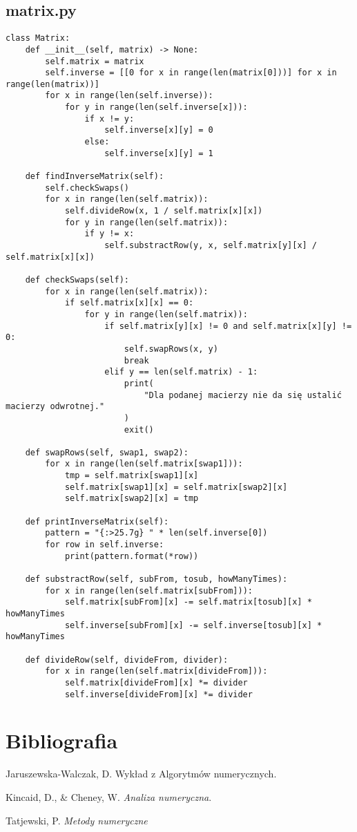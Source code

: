 \documentclass[12pt]{article}
\begin{document}
\subsection{matrix.py}
\begin{verbatim}
class Matrix:
    def __init__(self, matrix) -> None:
        self.matrix = matrix
        self.inverse = [[0 for x in range(len(matrix[0]))] for x in range(len(matrix))]
        for x in range(len(self.inverse)):
            for y in range(len(self.inverse[x])):
                if x != y:
                    self.inverse[x][y] = 0
                else:
                    self.inverse[x][y] = 1

    def findInverseMatrix(self):
        self.checkSwaps()
        for x in range(len(self.matrix)):
            self.divideRow(x, 1 / self.matrix[x][x])
            for y in range(len(self.matrix)):
                if y != x:
                    self.substractRow(y, x, self.matrix[y][x] / self.matrix[x][x])

    def checkSwaps(self):
        for x in range(len(self.matrix)):
            if self.matrix[x][x] == 0:
                for y in range(len(self.matrix)):
                    if self.matrix[y][x] != 0 and self.matrix[x][y] != 0:
                        self.swapRows(x, y)
                        break
                    elif y == len(self.matrix) - 1:
                        print(
                            "Dla podanej macierzy nie da się ustalić macierzy odwrotnej."
                        )
                        exit()

    def swapRows(self, swap1, swap2):
        for x in range(len(self.matrix[swap1])):
            tmp = self.matrix[swap1][x]
            self.matrix[swap1][x] = self.matrix[swap2][x]
            self.matrix[swap2][x] = tmp

    def printInverseMatrix(self):
        pattern = "{:>25.7g} " * len(self.inverse[0])
        for row in self.inverse:
            print(pattern.format(*row))

    def substractRow(self, subFrom, tosub, howManyTimes):
        for x in range(len(self.matrix[subFrom])):
            self.matrix[subFrom][x] -= self.matrix[tosub][x] * howManyTimes
            self.inverse[subFrom][x] -= self.inverse[tosub][x] * howManyTimes

    def divideRow(self, divideFrom, divider):
        for x in range(len(self.matrix[divideFrom])):
            self.matrix[divideFrom][x] *= divider
            self.inverse[divideFrom][x] *= divider
\end{verbatim}
\section*{Bibliografia}
\begin{thebibliography}{}
	
Jaruszewska-Walczak, D. Wykład z Algorytmów numerycznych.

Kincaid, D., \& Cheney, W. \emph{Analiza numeryczna}.

Tatjewski, P. \emph{Metody numeryczne}
	
\end{thebibliography}
\end{document}
